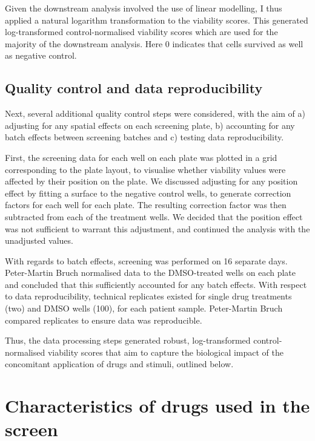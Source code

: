 \documentclass[11pt, a4paper, twosided]{book}
\begin{document}
Given the downstream analysis involved the use of linear modelling, I thus applied a natural logarithm transformation to the viability scores. This generated log-transformed control-normalised viability scores which are used for the majority of the downstream analysis. Here 0 indicates that cells survived as well as negative control.

\hypertarget{quality-control-and-data-reproducibility}{%
\subsection{Quality control and data reproducibility}\label{quality-control-and-data-reproducibility}}

Next, several additional quality control steps were considered, with the aim of a) adjusting for any spatial effects on each screening plate, b) accounting for any batch effects between screening batches and c) testing data reproducibility.

First, the screening data for each well on each plate was plotted in a grid corresponding to the plate layout, to visualise whether viability values were affected by their position on the plate. We discussed adjusting for any position effect by fitting a surface to the negative control wells, to generate correction factors for each well for each plate. The resulting correction factor was then subtracted from each of the treatment wells. We decided that the position effect was not sufficient to warrant this adjustment, and continued the analysis with the unadjusted values.

With regards to batch effects, screening was performed on 16 separate days. Peter-Martin Bruch normalised data to the DMSO-treated wells on each plate and concluded that this sufficiently accounted for any batch effects. With respect to data reproducibility, technical replicates existed for single drug treatments (two) and DMSO wells (100), for each patient sample. Peter-Martin Bruch compared replicates to ensure data was reproducible.

Thus, the data processing steps generated robust, log-transformed control-normalised viability scores that aim to capture the biological impact of the concomitant application of drugs and stimuli, outlined below.

\hypertarget{drugs}{%
\section{Characteristics of drugs used in the screen}\label{drugs}}
\end{document}
